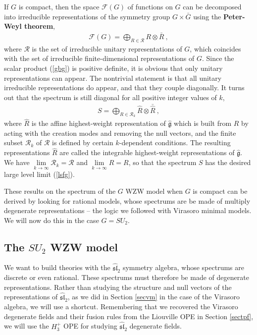 \documentclass[12pt,a4paper,notitlepage]{report}
\numberwithin{equation}{section}
\theoremstyle{break}
\begin{document}
If $G$ is compact, then the space $\mathcal{F}(G)$ of functions on $G$ can be decomposed into irreducible representations of the symmetry group $G\times \bar{G}$ using the \textbf{\boldmath Peter-Weyl theorem}, 
\begin{align}
 \mathcal{F}(G) = \bigoplus_{R\in \mathcal{R}} R\otimes \bar{R}\ ,
\end{align}
where $\mathcal{R}$ is the set of irreducible unitary representations of $G$, which coincides with the set of irreducible finite-dimensional representations of $G$.
Since the scalar product (\ref{gbg}) is positive definite, it is obvious that only unitary representations can appear. The nontrivial statement is that all unitary irreducible representations do appear, and that they couple diagonally. 
It turns out that the spectrum is still diagonal for all positive integer values of $k$, \cite{fms97}
\begin{align}
 S = \bigoplus_{R\in \mathcal{R}_k} \hat{R}\otimes \bar{\hat{R}}\ ,
\end{align}
where $\hat{R}$ is the affine highest-weight representation of $\hat{\mathfrak{g}}$ which is built from $R$ by acting with the creation modes and removing the null vectors, and the finite subset $\mathcal{R}_k$ of $\mathcal{R}$ is defined by certain $k$-dependent conditions. The resulting representations $\hat{R}$ are called the integrable highest-weight representations of $\hat{\mathfrak{g}}$. 
We have $\underset{k\rightarrow\infty}{\lim} \mathcal{R}_k =\mathcal{R}$ and $\underset{k\rightarrow \infty}{\lim} \hat{R} = R$, so that the spectrum $S$ has the desired large level limit (\ref{lsfg}).

These results on the spectrum of the $G$ WZW model when $G$ is compact can be derived by looking for rational models, whose spectrums are be made of multiply degenerate representations -- the logic we followed with Virasoro minimal models. We will now do this in the case $G=SU_2$.   


\subsection{The \texorpdfstring{$SU_2$}{SU(2)} WZW model \label{secsu}}

We want to build theories with the $\widehat{\mathfrak{sl}}_2$ symmetry algebra, whose spectrums are discrete or even rational. These spectrums must therefore be made of degenerate representations. Rather than studying the structure and null vectors of the representations of $\widehat{\mathfrak{sl}}_2$, as we did in Section \ref{secvm} in the case of the Virasoro algebra, 
we will use a shortcut. Remembering that we recovered
the Virasoro degenerate fields and their fusion rules from the Liouville OPE in Section \ref{sectpf},
we will use the $H_3^+$ OPE for studying $\widehat{\mathfrak{sl}}_2$ degenerate fields. 
\end{document}
